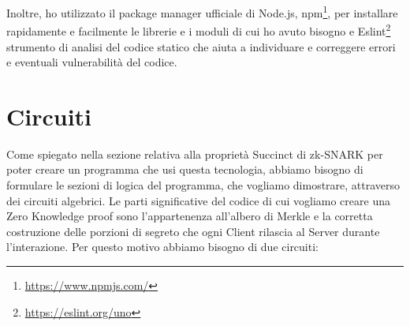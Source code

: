 Inoltre, ho utilizzato il package manager ufficiale di Node.js, npm\footnote{\url{https://www.npmjs.com/}}, per
installare rapidamente e facilmente le librerie e i moduli di cui ho avuto bisogno e
Eslint\footnote{\url{https://eslint.org/uno}}  strumento di analisi del codice statico che aiuta a individuare e
correggere errori e eventuali vulnerabilità del codice.

\section{Circuiti}
Come spiegato nella sezione relativa alla proprietà Succinct di zk-SNARK per poter creare un programma che usi questa
tecnologia, abbiamo bisogno di formulare le sezioni di logica del programma, che vogliamo dimostrare, attraverso dei
circuiti algebrici. Le parti significative del codice di cui vogliamo creare una Zero Knowledge proof sono
l'appartenenza  all'albero di Merkle e la corretta costruzione delle porzioni di segreto che ogni Client rilascia al
Server durante l'interazione. Per questo motivo abbiamo bisogno di due circuiti:\clearpage
